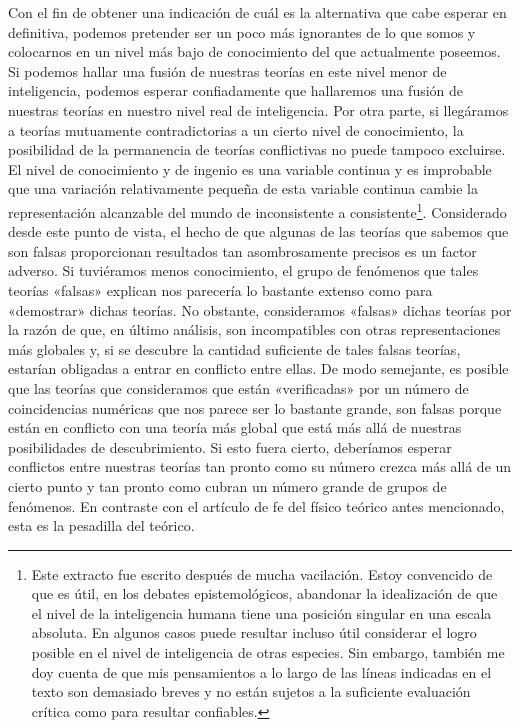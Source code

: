 \documentclass[a4paper, 12pt]{article}
\begin{document}
Con el fin de obtener una indicación de cuál es la alternativa que cabe esperar en definitiva, podemos pretender ser un poco más ignorantes de lo que somos y colocarnos en un nivel más bajo de conocimiento del que actualmente poseemos. Si podemos hallar una fusión de nuestras teorías en este nivel menor de inteligencia, podemos esperar confiadamente que hallaremos una fusión de nuestras teorías en nuestro nivel real de inteligencia. Por otra parte, si llegáramos a teorías mutuamente contradictorias a un cierto nivel de conocimiento, la posibilidad de la permanencia de teorías conflictivas no puede tampoco excluirse. El nivel de conocimiento y de ingenio es una variable continua y es improbable que una variación relativamente pequeña de esta variable continua cambie la representación alcanzable del mundo de inconsistente a consistente\footnote{Este extracto fue escrito después de mucha vacilación. Estoy convencido de que es útil, en los debates epistemológicos, abandonar la idealización de que el nivel de la inteligencia humana tiene una posición singular en una escala absoluta. En algunos casos puede resultar incluso útil considerar el logro posible en el nivel de inteligencia de otras especies. Sin embargo, también me doy cuenta de que mis pensamientos a lo largo de las líneas indicadas en el texto son demasiado breves y no están sujetos a la suficiente evaluación crítica como para resultar confiables.}. Considerado desde este punto de vista, el hecho de que algunas de las teorías que sabemos que son falsas proporcionan resultados tan asombrosamente precisos es un factor adverso. Si tuviéramos menos conocimiento, el grupo de fenómenos que tales teorías «falsas» explican nos parecería lo bastante extenso como para «demostrar» dichas teorías. No obstante, consideramos «falsas» dichas teorías por la razón de que, en último análisis, son incompatibles con otras representaciones más globales y, si se descubre la cantidad suficiente de tales falsas teorías, estarían obligadas a entrar en conflicto entre ellas. De modo semejante, es posible que las teorías que consideramos que están «verificadas» por un número de coincidencias numéricas que nos parece ser lo bastante grande, son falsas porque están en conflicto con una teoría más global que está más allá de nuestras posibilidades de descubrimiento. Si esto fuera cierto, deberíamos esperar conflictos entre nuestras teorías tan pronto como su número crezca más allá de un cierto punto y tan pronto como cubran un número grande de grupos de fenómenos. En contraste con el artículo de fe del físico teórico antes mencionado, esta es la pesadilla del teórico.
\end{document}
